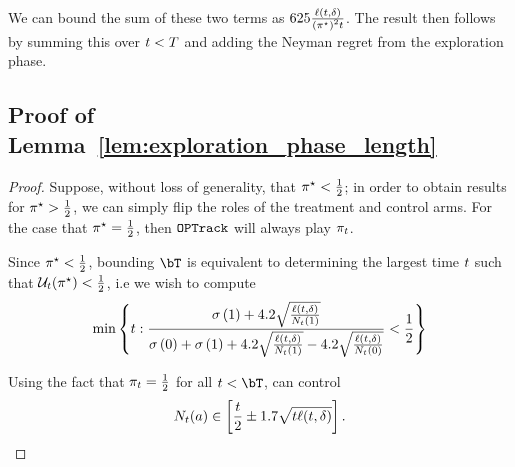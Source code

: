         We can bound the sum of these two terms as $625 \frac{\ell(\round, \errorProb)}{\paren{\neymanPolicy}^2\round}$.
        The result then follows by summing this over $t < T$ and adding the Neyman regret from the exploration phase.

    \subsection{Proof of Lemma~\ref{lem:exploration_phase_length}}\label{app:exploration-phase}
        
        \begin{proof}
                    Suppose, without loss of generality, that $\neymanPolicy < \frac{1}{2}$; in order to obtain results for $\neymanPolicy > \frac{1}{2}$, we can simply flip the roles of the treatment and control arms.
                    For the case that $\neymanPolicy = \frac{1}{2}$, then $\texttt{OPTrack}$ will always play $\policy_\round$.
                    
                    Since $\neymanPolicy < \frac{1}{2}$, bounding $\exploreTime$ is equivalent to determining the largest time $t$ such that $\UCS[\round][\neymanPolicy] < \frac{1}{2}$, i.e we wish to compute
                    \begin{equation}\label{eq:explore-time-bound-1}
                        \min\cbrk{\round : \frac{
                                \stdev[\tidx] + 4.2\sqrt{
                                \frac{\ell(\round, \errorProb)}
                                {\acount{\round}{\tidx}}}
                            }
                            {
                                \stdev[\cidx]
                                + \stdev[\tidx] 
                                + 4.2 \sqrt{ \frac{\ell(\round, \errorProb)}
                                {\acount{\round}{\tidx}}}
                                - 4.2 \sqrt{ \frac{\ell(\round, \errorProb)}
                                {\acount{\round}{\cidx}}}
                                }
                            < \frac{1}{2}
                        }
                    \end{equation}

                    Using the fact that $\policy_\round = \frac{1}{2}$ for all $\round < \exploreTime$, can control
                    \begin{equation}
                        N_{t}(a) \in \left[ \frac{t}{2} \pm 1.7 \sqrt{t \ell(t, \delta)} \right].
                    \end{equation}


\end{proof}
